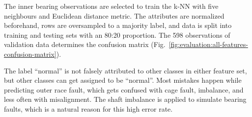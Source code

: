 The inner bearing observations are selected to train the k-NN with five neighbours and Euclidean distance metric. The attributes are normalized beforehand, rows are oversampled to a majority label, and data is split into training and testing sets with an 80:20 proportion. The 598 observations of validation data determines the confusion matrix (Fig.~\ref{fig:evaluation:all-features-confusion-matrix}). 

The label ``normal'' is not falsely attributed to other classes in either feature set, but other classes can get assigned to be ``normal''. Most mistakes happen while predicting outer race fault, which gets confused with cage fault, imbalance, and less often with misalignment. The shaft imbalance is applied to simulate bearing faults, which is a natural reason for this high error rate.

